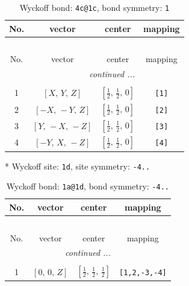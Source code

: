 \documentclass[fleqn,8pt]{jsarticle}
\begin{document}
\begin{longtable}{cccc}
\caption{Wyckoff bond: {\tt 4c@1c}, bond symmetry: {\tt 1}}
 \\
 \hline \hline
No. & vector & center & mapping \\ \hline \endfirsthead

\multicolumn{3}{l}{\tablename\ \thetable{}} \\
 \hline \hline
No. & vector & center & mapping \\ \hline \endhead

 \hline \hline
\multicolumn{3}{r}{\footnotesize\it continued ...} \\ \endfoot

 \hline \hline
\multicolumn{3}{r}{} \\ \endlastfoot

1 & $\left[ X,\, Y,\, Z \right]$ & $\left[ \frac{1}{2},\, \frac{1}{2},\, 0 \right]$ & {\tt [1]} \\ \hline
2 & $\left[ - X,\, - Y,\, Z \right]$ & $\left[ \frac{1}{2},\, \frac{1}{2},\, 0 \right]$ & {\tt [2]} \\ \hline
3 & $\left[ Y,\, - X,\, - Z \right]$ & $\left[ \frac{1}{2},\, \frac{1}{2},\, 0 \right]$ & {\tt [3]} \\ \hline
4 & $\left[ - Y,\, X,\, - Z \right]$ & $\left[ \frac{1}{2},\, \frac{1}{2},\, 0 \right]$ & {\tt [4]} \\
\end{longtable}
* Wyckoff site: {\tt 1d}, site symmetry: {\tt -4..}
\renewcommand{\arraystretch}{1.2}
\begin{longtable}{cccc}
\caption{Wyckoff bond: {\tt 1a@1d}, bond symmetry: {\tt -4..}}
 \\
 \hline \hline
No. & vector & center & mapping \\ \hline \endfirsthead

\multicolumn{3}{l}{\tablename\ \thetable{}} \\
 \hline \hline
No. & vector & center & mapping \\ \hline \endhead

 \hline \hline
\multicolumn{3}{r}{\footnotesize\it continued ...} \\ \endfoot

 \hline \hline
\multicolumn{3}{r}{} \\ \endlastfoot

1 & $\left[ 0,\, 0,\, Z \right]$ & $\left[ \frac{1}{2},\, \frac{1}{2},\, \frac{1}{2} \right]$ & {\tt [1,2,-3,-4]} \\
\end{longtable}
\end{document}
